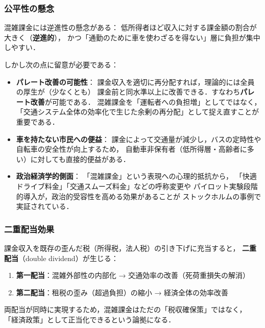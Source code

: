 \subsubsection*{公平性の懸念}

混雑課金には逆進性の懸念がある：
低所得者ほど収入に対する課金額の割合が大きく（\textbf{逆進的}），
かつ「通勤のために車を使わざるを得ない」層に負担が集中しやすい\cite{Pigou1920}．

しかし次の点に留意が必要である：

\begin{itemize}
  \item
    \textbf{パレート改善の可能性}：
    課金収入を適切に再分配すれば，理論的には全員の厚生が（少なくとも）
    課金前と同水準以上に改善できる．すなわち\textbf{パレート改善}が可能である．
    混雑課金を「運転者への負担増」としてではなく，
    「交通システム全体の効率化で生じた余剰の再分配」として捉え直すことが重要である．

  \item
    \textbf{車を持たない市民への便益}：
    課金によって交通量が減少し，バスの定時性や自転車の安全性が向上するため，
    自動車非保有者（低所得層・高齢者に多い）に対しても直接的便益がある．

  \item
    \textbf{政治経済学的側面}：
    「混雑課金」という表現への心理的抵抗から，
    「快適ドライブ料金」「交通スムーズ料金」などの呼称変更や
    パイロット実験段階的導入が，政治的受容性を高める効果があることが
    ストックホルムの事例で実証されている\cite{Vickrey1969}．
\end{itemize}

\subsubsection*{二重配当効果}

課金収入を既存の歪んだ税（所得税，法人税）の引き下げに充当すると，
\textbf{二重配当}（double dividend）が生じる\cite{Pigou1920}：

\begin{enumerate}
  \item \textbf{第一配当}：混雑外部性の内部化 → 交通効率の改善（死荷重損失の解消）
  \item \textbf{第二配当}：租税の歪み（超過負担）の縮小 → 経済全体の効率改善
\end{enumerate}

両配当が同時に実現するため，混雑課金はただの「税収確保策」ではなく，
「経済政策」として正当化できるという論拠になる．

